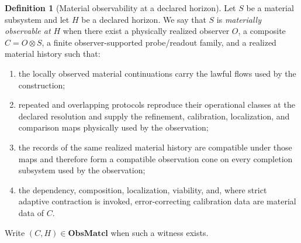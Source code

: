 \documentclass[11pt]{article}
\theoremstyle{definition}
\newtheorem{definition}{Definition}
\newcommand{\ObsMatcl}{\mathbf{ObsMatcl}}
\begin{document}
\begin{definition}[Material observability at a declared horizon] \label{def:material-observability} Let \(S\) be a material subsystem and let \(H\) be a declared horizon. We say that \(S\) is \emph{materially observable at \(H\)} when there exist a physically realized observer \(O\), a composite \(C=O\otimes S\), a finite observer-supported probe/readout family, and a realized material history such that: \begin{enumerate}[label=(\roman*)] \item the locally observed material continuations carry the lawful flows used by the construction; 
\item repeated and overlapping protocols reproduce their operational classes at the declared resolution and supply the refinement, calibration, localization, and comparison maps physically used by the observation; 
\item the records of the same realized material history are compatible under those maps and therefore form a compatible observation cone on every completion subsystem used by the observation; 
\item the dependency, composition, localization, viability, and, where strict adaptive contraction is invoked, error-correcting calibration data are material data of \(C\). \end{enumerate} Write \((C,H)\in\ObsMatcl\) when such a witness exists. \end{definition} 
\end{document}
